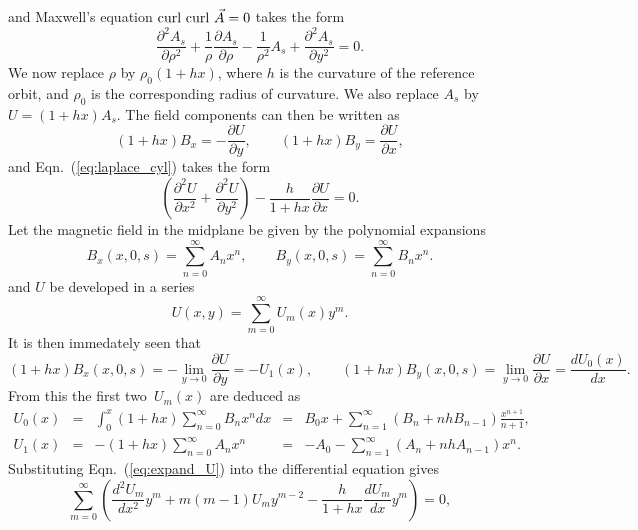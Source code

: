 \documentclass{report}
\begin{document}
and Maxwell's equation $\hbox{curl curl\ }\vec{A} = 0$ takes the form 
\begin{equation}
  \frac{\partial^2 A_s}{\partial \rho^2} + 
  \frac{1}{\rho}\frac{\partial A_s}{\partial \rho} -
  \frac{1}{\rho^2} A_s +
  \frac{\partial^2 A_s}{\partial y^2} = 0.
  \label{eq:laplace_cyl}
\end{equation}
We now replace $\rho$ by $\rho_0 (1 + h x)$,
where $h$ is the curvature of the reference orbit, and $\rho_0$ is the
corresponding radius of curvature. 
We also replace $A_s$ by $U = (1 + hx) A_s$.
The field components can then be written as
\begin{equation}
  (1 + hx) B_x = - \frac{\partial U}{\partial y}, \qquad
  (1 + hx) B_y = \frac{\partial U}{\partial x},
\end{equation}
and Eqn.~(\ref{eq:laplace_cyl}) takes the form
\begin{equation}
  \left(
    \frac{\partial^2 U}{\partial x^2} + 
    \frac{\partial^2 U}{\partial y^2} 
  \right) -
  \frac{h}{1 + hx} \frac{\partial U}{\partial x}  = 0.
\end{equation}
Let the magnetic field in the midplane be given by the polynomial
expansions
\begin{equation}
  B_x(x,0,s) = \sum_{n=0}^\infty A_n x^n, \qquad
  B_y(x,0,s) = \sum_{n=0}^\infty B_n x^n.
\end{equation}
and $U$ be developed in a series
\begin{equation}
  U(x,y) = \sum_{m=0}^\infty U_m(x) y^m.
  \label{eq:expand_U}
\end{equation}
It is then immedately seen that
\begin{equation}
  (1+hx)B_x(x,0,s)=-\lim_{y\rightarrow 0}\frac{\partial U}{\partial y} =
  -U_1(x),\qquad
  (1+hx)B_y(x,0,s)=\lim_{y\rightarrow 0}\frac{\partial U}{\partial x} =
  \frac{dU_0(x)}{dx}.
\end{equation}
From this the first two~$U_m(x)$ are deduced as
\begin{equation}\begin{array}{lclcl}
    U_0(x)&=&\int_0^x (1+hx)\sum_{n=0}^\infty B_n x^n dx
    &=&B_0x+\sum_{n=1}^\infty (B_n + n h B_{n-1}) \frac{x^{n+1}}{n+1},
    \\
    U_1(x)&=&-(1+hx)\sum_{n=0}^\infty A_n x^n
    &=& -A_0-\sum_{n=1}^\infty (A_n + n h A_{n-1}) x^n.
  \end{array}
\end{equation}
Substituting Eqn.~(\ref{eq:expand_U}) into the differential equation gives
\begin{equation}
  \sum_{m=0}^\infty \left(
    \frac{d^2 U_m}{dx^2} y^m + m(m-1)U_m y^{m-2}
    -\frac{h}{1+hx} \frac{dU_m}{dx} y^m
  \right) = 0,
\end{equation}
\end{document}
